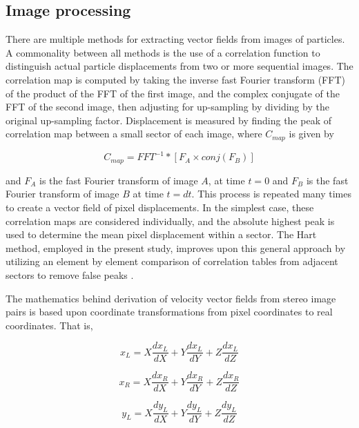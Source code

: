 \subsection{Image processing}

There are multiple methods for extracting vector fields from images of 
particles. A commonality between all methods is the use of a correlation 
function to distinguish actual particle displacements from two or more 
sequential images. The correlation map is 
computed by taking the inverse fast Fourier transform (FFT) of the product of 
the FFT of the first image, and the complex conjugate of the FFT of the second 
image, then adjusting for up-sampling by dividing by the original up-sampling 
factor. Displacement is measured by finding the peak of correlation map 
between a small sector of each image, where $C_{map}$ is given by

\begin{equation}
C_{map} = FFT^{-1} * [F_A \times conj(F_B) ]
\label{eq:correlation_map}
\end{equation}

\noindent
and $F_A$ is the fast Fourier transform of 
image $A$, at time $t=0$ and $F_B$ is the fast Fourier transform of image $B$ 
at time $t=dt$. This process is repeated many times to create a vector field of 
pixel displacements. In the simplest case, these correlation maps are 
considered individually, and the absolute highest peak is used to determine the 
mean pixel displacement within a sector. The Hart method, employed in the 
present study, improves upon this general approach by utilizing an element by 
element comparison of correlation tables from adjacent sectors to remove false 
peaks \cite{hart1998,hart1999}.

The mathematics behind derivation of velocity vector fields from stereo image 
pairs is based upon coordinate transformations from pixel coordinates to real 
coordinates. That is, 

\begin{equation}
x_L= X\frac{dx_L}{dX} + Y\frac{dx_L}{dY} + Z\frac{dx_L}{dZ}
\label{eq:piv_to_real1}
\end{equation}

\begin{equation}
x_R= X\frac{dx_R}{dX} + Y\frac{dx_R}{dY} + Z\frac{dx_R}{dZ}
\label{eq:piv_to_real2}
\end{equation}

\begin{equation}
y_L= X\frac{dy_L}{dX} + Y\frac{dy_L}{dY} + Z\frac{dy_L}{dZ}
\label{eq:piv_to_real3}
\end{equation}


